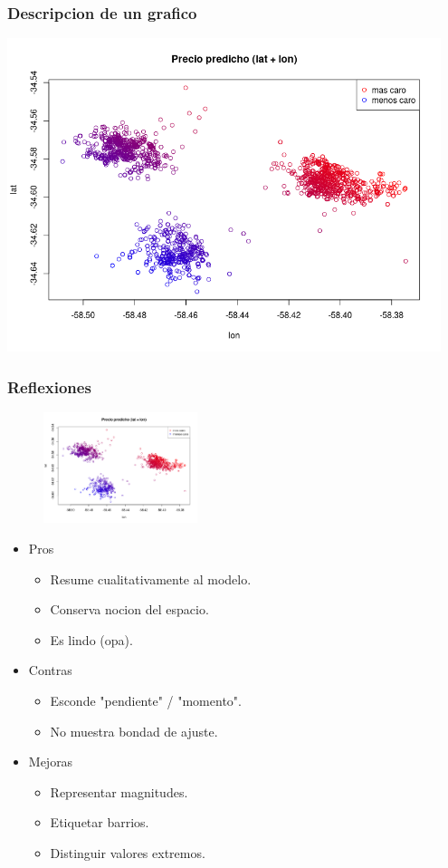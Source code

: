 \documentclass{beamer}
\begin{document}
\begin{frame}
\frametitle{Descripcion de un grafico}
\includegraphics[width=0.95\textwidth]{grafico.png}
\end{frame}

\begin{frame}
\frametitle{Reflexiones}
\begin{figure}
    \begin{center}
        \includegraphics[width=0.4\textwidth]{grafico.png}
    \end{center}
\end{figure} 
\phantom{}
\begin{itemize}
\item Pros
    \begin{itemize}
    \item Resume cualitativamente al modelo.
    \item Conserva nocion del espacio.
    \item Es lindo (opa).
    \end{itemize}
\item Contras
    \begin{itemize}
    \item Esconde "pendiente" / "momento".
    \item No muestra bondad de ajuste.
    \end{itemize}
\item Mejoras
    \begin{itemize}
    \item Representar magnitudes.
    \item Etiquetar barrios.
    \item Distinguir valores extremos.
    \end{itemize}
\end{itemize}
\end{frame}
\end{document}
